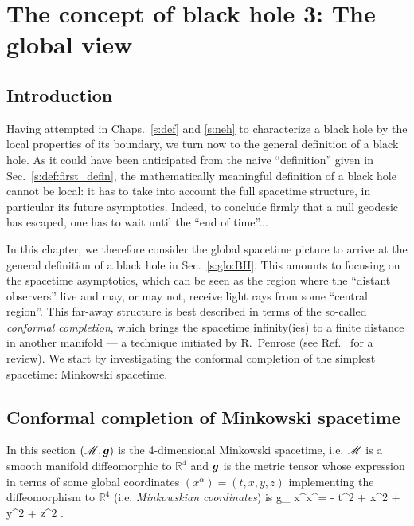 \chapter{The concept of black hole 3: The global view}
\label{s:glo}

\minitoc

\section{Introduction}

Having attempted in Chaps.~\ref{s:def} and \ref{s:neh} to characterize a black hole by the local
properties of its boundary, we turn now to the general definition of a black
hole. As it could have been anticipated from the naive ``definition'' given
in Sec.~\ref{s:def:first_defin}, the mathematically meaningful definition
of a black hole cannot be local: it has to take into account the full
spacetime structure, in particular its future asymptotics. Indeed, to conclude
firmly that a null geodesic has escaped, one has to wait until the ``end
of time''...

In this chapter, we therefore consider the global spacetime picture to
arrive at the general definition of a black hole in
Sec.~\ref{s:glo:BH}.
This amounts to focusing on the
spacetime asymptotics, which can be seen as
the region where the ``distant observers'' live and may, or may not, receive
light rays from some ``central region''. This far-away structure is best
described in terms of the so-called \emph{conformal completion}, which brings
the spacetime infinity(ies) to a finite distance in another manifold
--- a technique initiated by R.~Penrose \cite{Penro63,Penro64} (see
Ref.~\cite{Fraue04} for a review).
We start by investigating the conformal completion of the simplest
spacetime: Minkowski spacetime.


\section{Conformal completion of Minkowski spacetime} \label{s:glo:conf_Mink}

In this section $(\mathscr{M},\bm{g})$ is the 4-dimensional Minkowski spacetime,
i.e. $\mathscr{M}$ is a smooth manifold diffeomorphic to $\mathbb{R}^4$ and $\bm{g}$
is the metric tensor whose expression in terms of some global coordinates
$(x^\alpha) = (t, x, y, z)$ implementing the diffeomorphism to $\mathbb{R}^4$
(i.e. \emph{Minkowskian coordinates})
is
\be \label{e:glo:Mink_metric}
    g_{\mu\nu} \D x^\mu \D x^\nu = - \D t^2 + \D x^2 + \D y^2 + \D z^2 .
\ee

